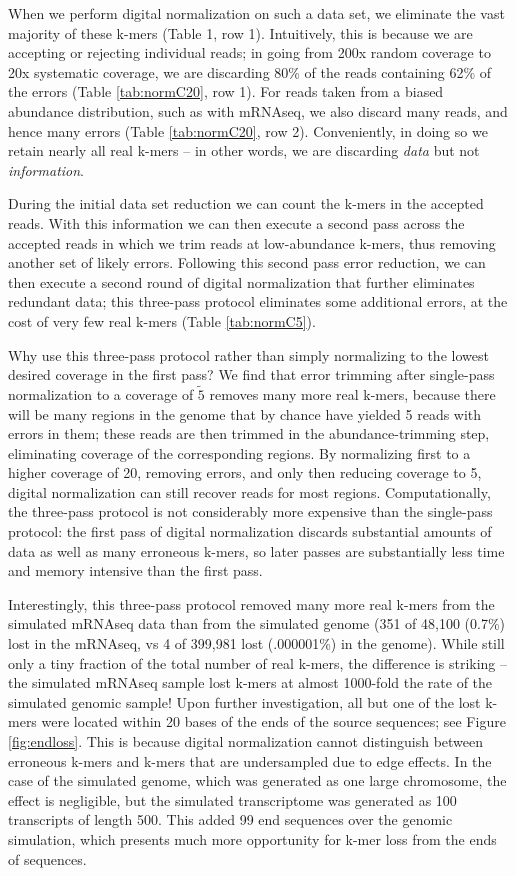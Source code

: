 \documentclass[10pt]{article}
\begin{document}
When we perform digital normalization on such a data set, we eliminate
the vast majority of these k-mers (Table 1, row 1).  Intuitively, this is
because we are accepting or rejecting individual reads; in going from
200x random coverage to 20x systematic coverage, we are discarding
80\% of the reads containing 62\% of the errors (Table \ref{tab:normC20}, row 1).
For reads taken from a biased abundance distribution, such as with
mRNAseq, we also discard many reads, and hence many errors (Table \ref{tab:normC20}, row 2).
Conveniently, in doing so we retain nearly all real k-mers -- in other words,
we are discarding {\em data} but not {\em information}.

During the initial data set reduction we can count the k-mers in the
accepted reads.  With this information we can then execute a second pass
across the accepted reads in which we trim reads at low-abundance
k-mers, thus removing another set of likely errors.  Following this
second pass error reduction, we can then execute a second round of
digital normalization that further eliminates redundant data; this
three-pass protocol eliminates some additional errors, at the cost of
very few real k-mers (Table \ref{tab:normC5}).

Why use this three-pass protocol rather than simply normalizing to the
lowest desired coverage in the first pass?  We find that error
trimming after single-pass normalization to a coverage of $\tilde 5$
removes many more real k-mers, because there will be many regions in
the genome that by chance have yielded 5 reads with errors in them;
these reads are then trimmed in the abundance-trimming step,
eliminating coverage of the corresponding regions.  By normalizing
first to a higher coverage of 20, removing errors, and only then
reducing coverage to 5, digital normalization can still recover reads
for most regions.  Computationally, the three-pass protocol is not
considerably more expensive than the single-pass protocol: the first
pass of digital normalization discards substantial amounts of data as
well as many erroneous k-mers, so later passes are substantially less time
and memory intensive than the first pass.

Interestingly, this three-pass protocol removed many more real k-mers
from the simulated mRNAseq data than from the simulated genome (351 of
48,100 (0.7\%) lost in the mRNAseq, vs 4 of 399,981 lost
(.000001\%) in the genome).  While still only a tiny fraction of the
total number of real k-mers, the difference is striking -- the
simulated mRNAseq sample lost k-mers at almost 1000-fold the rate of
the simulated genomic sample!  Upon further investigation, all but one
of the lost k-mers were located within 20 bases of the ends of the
source sequences; see Figure \ref{fig:endloss}.  This is because
digital normalization cannot distinguish between erroneous k-mers and
k-mers that are undersampled due to edge effects.  In the case of the
simulated genome, which was generated as one large chromosome, the
effect is negligible, but the simulated transcriptome was generated as
100 transcripts of length 500.  This added 99 end sequences over the
genomic simulation, which presents much more opportunity for k-mer
loss from the ends of sequences.
\end{document}

